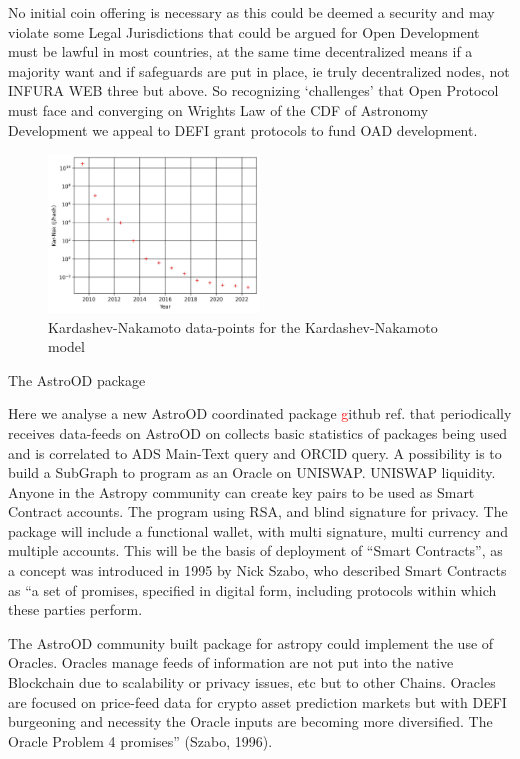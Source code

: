 \documentclass[final,5p,times,twocolumn,authoryear]{elsarticle}
\begin{document}
No initial coin offering is necessary as this could be deemed a security and may violate some Legal Jurisdictions that could be argued for Open Development must be lawful in most countries, at the same time decentralized means if a majority want and if safeguards are put in place, ie truly decentralized nodes, not INFURA WEB three but above. So recognizing `challenges' that Open Protocol must face and converging on Wrights Law of the CDF of Astronomy Development we appeal to DEFI grant protocols to fund OAD development. 

\begin{figure}
    \centering
    \includegraphics[width=0.50\textwidth]{figs/figkarnak.jpg}
    \caption{Kardashev-Nakamoto data-points for the Kardashev-Nakamoto model}
    \label{fig:karnak}

\end{figure}
The AstroOD package 

Here we analyse a new AstroOD coordinated package \textcolor{red} github ref. that periodically receives data-feeds on AstroOD on collects basic statistics of packages being used and is correlated to ADS Main-Text query and ORCID query. A possibility is to build a SubGraph to program as an Oracle on UNISWAP. UNISWAP liquidity. Anyone in the Astropy community can create key pairs to be used as Smart Contract accounts. The program using RSA, and blind signature for privacy. The package will include a functional wallet, with multi signature, multi currency and multiple accounts. This will be the basis of deployment of “Smart Contracts”, as a concept was introduced in 1995 by Nick Szabo, who described Smart Contracts as “a set of promises,
specified in digital form, including protocols within which these parties perform.

The AstroOD community built package for astropy could implement the use of Oracles. Oracles manage feeds of information are not put into the native Blockchain due to scalability or privacy issues, etc but to other Chains.  Oracles are focused on price-feed data for crypto asset prediction markets but with DEFI burgeoning and necessity the Oracle inputs are becoming more diversified.  The Oracle Problem 4 promises” (Szabo, 1996). 
\end{document}
